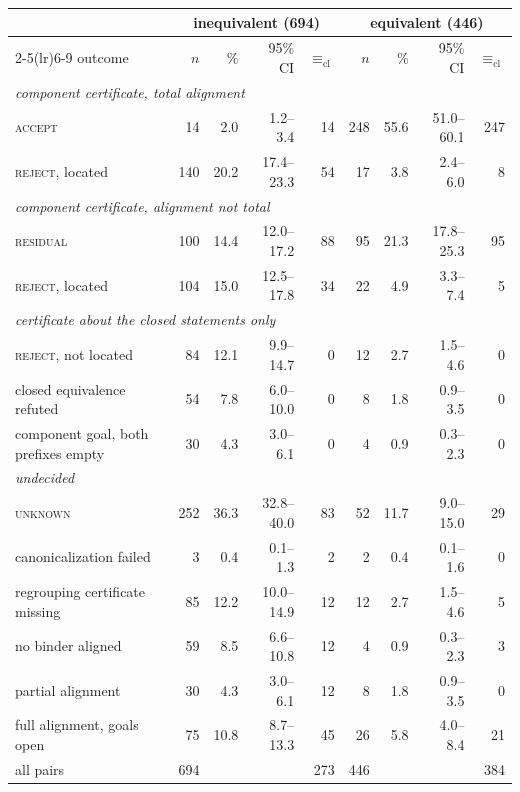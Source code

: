\documentclass[10pt]{article}
\theoremstyle{definition}
\newcommand{\Ecl}{\mathrel{\equiv_{\mathrm{cl}}}}
\newcommand{\V}[1]{\textsc{#1}}
\begin{document}
\begin{table}[t]
\centering\small\setlength{\tabcolsep}{4pt}
\begin{tabular}{lrrrrrrrr}
\toprule
& \multicolumn{4}{c}{inequivalent (694)} & \multicolumn{4}{c}{equivalent (446)}\\
\cmidrule(lr){2-5}\cmidrule(lr){6-9}
outcome & $n$ & \% & 95\% CI & $\Ecl$ & $n$ & \% & 95\% CI & $\Ecl$\\
\midrule
\multicolumn{9}{l}{\emph{component certificate, total alignment}}\\
\V{accept} & 14 & 2.0 & 1.2--3.4 & 14 & 248 & 55.6 & 51.0--60.1 & 247\\
\V{reject}, located & 140 & 20.2 & 17.4--23.3 & 54 & 17 & 3.8 & 2.4--6.0 & 8\\
\multicolumn{9}{l}{\emph{component certificate, alignment not total}}\\
\V{residual} & 100 & 14.4 & 12.0--17.2 & 88 & 95 & 21.3 & 17.8--25.3 & 95\\
\V{reject}, located & 104 & 15.0 & 12.5--17.8 & 34 & 22 & 4.9 & 3.3--7.4 & 5\\
\multicolumn{9}{l}{\emph{certificate about the closed statements only}}\\
\V{reject}, not located & 84 & 12.1 & 9.9--14.7 & 0 & 12 & 2.7 & 1.5--4.6 & 0\\
\quad closed equivalence refuted & 54 & 7.8 & 6.0--10.0 & 0 & 8 & 1.8 & 0.9--3.5 & 0\\
\quad component goal, both prefixes empty & 30 & 4.3 & 3.0--6.1 & 0 & 4 & 0.9 & 0.3--2.3 & 0\\
\multicolumn{9}{l}{\emph{undecided}}\\
\V{unknown} & 252 & 36.3 & 32.8--40.0 & 83 & 52 & 11.7 & 9.0--15.0 & 29\\
\quad canonicalization failed & 3 & 0.4 & 0.1--1.3 & 2 & 2 & 0.4 & 0.1--1.6 & 0\\
\quad regrouping certificate missing & 85 & 12.2 & 10.0--14.9 & 12 & 12 & 2.7 & 1.5--4.6 & 5\\
\quad no binder aligned & 59 & 8.5 & 6.6--10.8 & 12 & 4 & 0.9 & 0.3--2.3 & 3\\
\quad partial alignment & 30 & 4.3 & 3.0--6.1 & 12 & 8 & 1.8 & 0.9--3.5 & 0\\
\quad full alignment, goals open & 75 & 10.8 & 8.7--13.3 & 45 & 26 & 5.8 & 4.0--8.4 & 21\\
\midrule
all pairs & 694 & & & 273 & 446 & & & 384\\
\bottomrule
\end{tabular}

\end{table}
\end{document}
